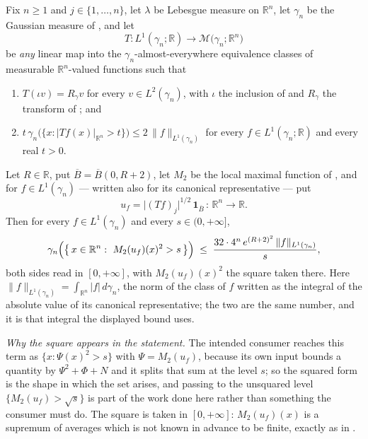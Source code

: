 \begin{lemma}
Fix $n \geq 1$ and $j \in \{1,\ldots,n\}$, let $\lambda$ be Lebesgue measure on
$\mathbb{R}^n$, let $\gamma_n$ be the Gaussian measure of
, and let
\[
  T : L^1(\gamma_n;\mathbb{R}) \longrightarrow
      \mathcal{M}\bigl(\gamma_n;\mathbb{R}^n\bigr)
\]
be \emph{any} linear map into the $\gamma_n$-almost-everywhere equivalence
classes of measurable $\mathbb{R}^n$-valued functions such that
\begin{enumerate}
\item[(T1)] $T(\iota v) = R_\gamma v$ for every $v \in L^2(\gamma_n)$, with
$\iota$ the inclusion of  and $R_\gamma$ the transform of
; and
\item[(T2)] $t\,\gamma_n\bigl(\{x : |Tf(x)|_{\mathbb{R}^n} > t\}\bigr)
\leq 2\,\|f\|_{L^1(\gamma_n)}$ for every $f \in L^1(\gamma_n;\mathbb{R})$ and
every real $t > 0$.
\end{enumerate}
Let $R \in \mathbb{R}$, put $\overline B = \overline B(0,R+2)$, let $M_2$ be the
local maximal function of , and for
$f \in L^1(\gamma_n)$ --- written also for its canonical representative --- put
\[
  u_f = \bigl|(Tf)_j\bigr|^{1/2}\,\mathbf 1_{\overline B}
  \,:\, \mathbb{R}^n \to \mathbb{R} .
\]
Then for every $f \in L^1(\gamma_n)$ and every $s \in (0,+\infty]$,
\[
  \gamma_n\Bigl(\bigl\{\,x \in \mathbb{R}^n :\ M_2(u_f)(x)^2 > s\,\bigr\}\Bigr)
  \;\leq\;
  \frac{32\cdot4^n\,e^{(R+2)^2}\,\|f\|_{L^1(\gamma_n)}}{s} ,
\]
both sides read in $[0,+\infty]$, with $M_2(u_f)(x)^2$ the square taken there.
Here $\|f\|_{L^1(\gamma_n)} = \int_{\mathbb{R}^n}|f|\,d\gamma_n$, the norm of the
class of $f$ written as the integral of the absolute value of its canonical
representative; the two are the same number, and it is that integral the
displayed bound uses.

\emph{Why the square appears in the statement.}  The intended consumer reaches
this term as $\{x : \Psi(x)^2 > s\}$ with $\Psi = M_2(u_f)$, because its own
input bounds a quantity by $\Psi^2 + \Phi + N$ and it splits that sum at the
level $s$; so the squared form is the shape in which the set arises, and
passing to the unsquared level $\{M_2(u_f) > \sqrt s\}$ is part of the work
done here rather than something the consumer must do.  The square is taken in
$[0,+\infty]$: $M_2(u_f)(x)$ is a supremum of averages which is not known in
advance to be finite, exactly as in .


\end{lemma}
